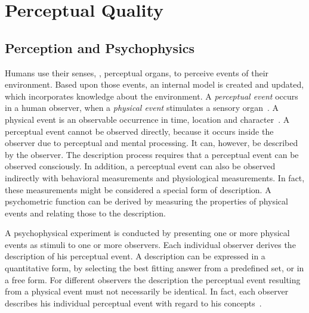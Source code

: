 \section{Perceptual Quality}
\subsection{Perception and Psychophysics}
Humans use their senses, \ie, perceptual organs, to perceive events of their environment.
Based upon those events, an internal model is created and updated, which incorporates knowledge about the environment.
A \emph{perceptual event} occurs in a human observer, when a \emph{physical event} stimulates a sensory organ~\citep[p.~5]{blauert_spatial_1996}.
A physical event is an observable occurrence in time, location and character~\citep{le_callet_qualinet_2013}.
A perceptual event cannot be observed directly, because it occurs inside the observer due to perceptual and mental processing.
It can, however, be described by the observer.
The description process requires that a perceptual event can be observed consciously.
In addition, a perceptual event can also be observed indirectly with behavioral measurements and physiological measurements.
In fact, these measurements might be considered a special form of description.
A psychometric function can be derived by measuring the properties of physical events and relating those to the description.

A psychophysical experiment is conducted by presenting one or more physical events as stimuli to one or more observers.
Each individual observer derives the description of his perceptual event.
A description can be expressed in a quantitative form, by selecting the best fitting answer from a predefined set, or in a free form.
For different observers the description the perceptual event resulting from a physical event must not necessarily be identical.
In fact, each observer describes his individual perceptual event with regard to his concepts~\citep[p.~11]{blauert_spatial_1996}.

